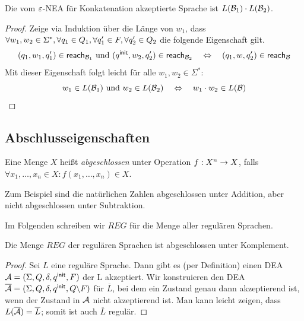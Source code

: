 \begin{lemma}\label{satz:2.ClosedConcatenation}
Die vom $\varepsilon$-NEA für Konkatenation akzeptierte Sprache ist $L(\mathcal{B}_1)\cdot L(\mathcal{B}_2)$.
\end{lemma}
\begin{proof}
 Zeige via Induktion über die Länge von $w_1$, dass $\forall w_1,w_2\in\Sigma^*, \forall q_1\in Q_1, \linebreak[1] \forall q_1'\in F, \forall q_2'\in Q_2$ die folgende Eigenschaft gilt.
 \[
 (q_1,w_1,q_1')\in\textsf{reach}_{\mathcal{B}_1} \text{ und } (q^\mathsf{init},w_2,q_2')\in\textsf{reach}_{\mathcal{B}_2} \quad\Leftrightarrow\quad (q_1,w,q_2')\in\textsf{reach}_{\mathcal{B}}
 \]
 Mit dieser Eigenschaft folgt leicht für alle $w_1, w_2 \in \Sigma^*$:
 \[
 w_1 \in L(\mathcal{B}_1) \text{ und } w_2 \in L(\mathcal{B}_2) \quad\Leftrightarrow\quad w_1 \cdot w_2 \in L(\mathcal{B})
 \qedhere
 \]
\end{proof}





\subsection{Abschlusseigenschaften}

\begin{Def}[name={[Abgeschlossenheit von $\mathcal{L}$]}]
        Eine Menge $X$ heißt \emph{abgeschlossen} unter Operation $f:X^n \-> X$, falls $\forall x_1,\dots, x_n\in X : f(x_1,\dots, x_n)\in X$.
\end{Def}
Zum Beispiel sind die natürlichen Zahlen abgeschlossen unter Addition, aber nicht abgeschlossen unter Subtraktion.

Im Folgenden schreiben wir $REG$ für die Menge aller regulären Sprachen.

\begin{lemma}\label{satz:2.ClosedComplement}
 Die Menge $REG$ der regulären Sprachen ist abgeschlossen unter Komplement.
\end{lemma}

\begin{proof}
Sei $L$ eine reguläre Sprache. 
Dann gibt es (per Definition) einen \acs*{DEA} $\mathcal{A}=(\Sigma, Q, \delta, q^\mathsf{init}, F)$ der L akzeptiert.
Wir konstruieren den \acs*{DEA} $\overline{\mathcal{A}}=(\Sigma, Q, \delta, q^\mathsf{init}, Q\backslash F)$ für $\overline{L}$, bei dem ein Zustand genau dann akzeptierend ist, wenn der Zustand in $\mathcal{A}$ nicht akzeptierend ist.
Man kann leicht zeigen, dass $L(\overline{\mathcal{A}})=\overline{L}$; somit ist auch $\overline{L}$ regulär.
\end{proof}

